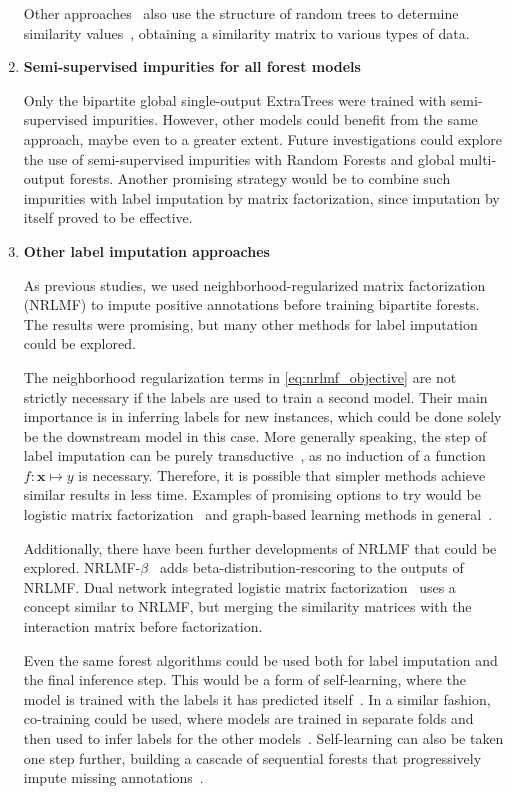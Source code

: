 \begin{enumerate}
    Other approaches~\cite{adiyeke2022semisupervised} also use the structure of random trees to determine similarity values~\cite{liu2008isolation}, obtaining a similarity matrix to various types of data.

    \item \textbf{Semi-supervised impurities for all forest models}

    Only the bipartite global single-output ExtraTrees were trained with semi-supervised impurities. However, other models could benefit from the same approach, maybe even to a greater extent. Future investigations could explore the use of semi-supervised impurities with Random Forests and global multi-output forests. Another promising strategy would be to combine such impurities with label imputation by matrix factorization, since imputation by itself proved to be effective.

    \item \textbf{Other label imputation approaches}

    As previous studies, we used neighborhood-regularized matrix factorization (NRLMF) to impute positive annotations before training bipartite forests. The results were promising, but many other methods for label imputation could be explored. 

    The neighborhood regularization terms in \autoref{eq:nrlmf_objective} are not strictly necessary if the labels are used to train a second model. Their main importance is in inferring labels for new instances, which could be done solely be the downstream model in this case.
    More generally speaking, the step of label imputation can be purely transductive~\cite{chapelle2006semisupervised,vanengelen2020survey}, as no induction of a function $f:\mathbf{x} \mapsto y$ is necessary.
    Therefore, it is possible that simpler methods achieve similar results in less time. Examples of promising options to try would be logistic matrix factorization~\cite{johnson2014logistic} and graph-based learning methods in general~\cite{chapelle2006semisupervised,vanengelen2020survey}.

    Additionally, there have been further developments of NRLMF that could be explored. NRLMF-$\beta$~\cite{ban2019nrlmf} adds beta-distribution-rescoring to the outputs of NRLMF. Dual network integrated logistic matrix factorization~\cite{hao2017predicting,li2019dnilmflda} uses a concept similar to NRLMF, but merging the similarity matrices with the interaction matrix before factorization.

    Even the same forest algorithms could be used both for label imputation and the final inference step. This would be a form of self-learning, where the model is trained with the labels it has predicted itself~\cite{vanengelen2020survey}. In a similar fashion, co-training could be used, where models are trained in separate folds and then used to infer labels for the other models~\cite{vanengelen2020survey}.
    Self-learning can also be taken one step further, building a cascade of sequential forests that progressively impute missing annotations~\cite{wang2020learning}.


\end{enumerate}
